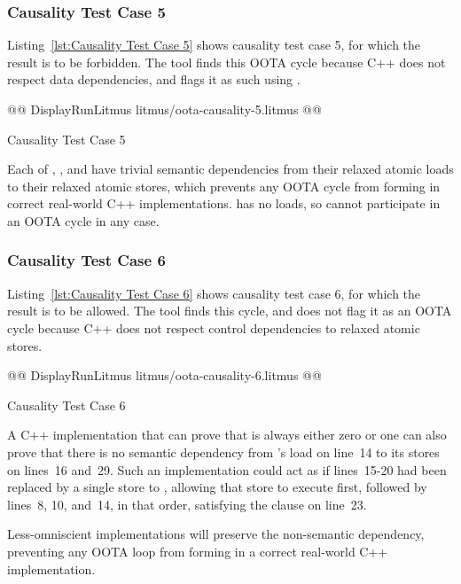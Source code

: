 \documentclass[10]{article}
\begin{document}
\subsubsection{Causality Test Case 5}
\label{app:Causality Test Case 5}

Listing~\ref{lst:Causality Test Case 5}
shows causality test case 5, for which the 
result is to be forbidden.
The  tool finds this OOTA cycle because C++ does not respect
data dependencies, and flags it as such using .

\begin{listing}[tbp]
@@ DisplayRunLitmus litmus/oota-causality-5.litmus @@
\caption{Causality Test Case 5}
\label{lst:Causality Test Case 5}
\end{listing}

Each of , , and  have trivial semantic
dependencies from their relaxed atomic loads to their relaxed
atomic stores, which prevents any OOTA cycle from forming in correct
real-world C++ implementations.
 has no loads, so cannot participate in an OOTA cycle in
any case.

\subsubsection{Causality Test Case 6}
\label{app:Causality Test Case 6}

Listing~\ref{lst:Causality Test Case 6}
shows causality test case 6, for which the 
result is to be allowed.
The  tool finds this cycle, and does not flag it as an OOTA
cycle because C++ does not respect control dependencies to relaxed
atomic stores.

\begin{listing}[tbp]
@@ DisplayRunLitmus litmus/oota-causality-6.litmus @@
\caption{Causality Test Case 6}
\label{lst:Causality Test Case 6}
\end{listing}

A C++ implementation that can prove that  is always either
zero or one can also prove that there is no semantic dependency
from 's load on line~14 to its stores on lines~16 and~29.
Such an implementation could act as if lines~15-20 had been replaced
by a single store to , allowing that store to execute first,
followed by lines~8, 10, and~14, in that order, satisfying the
 clause on line~23.

Less-omniscient implementations will preserve the non-semantic
dependency, preventing any OOTA loop from forming in a correct real-world C++
implementation.
\end{document}
